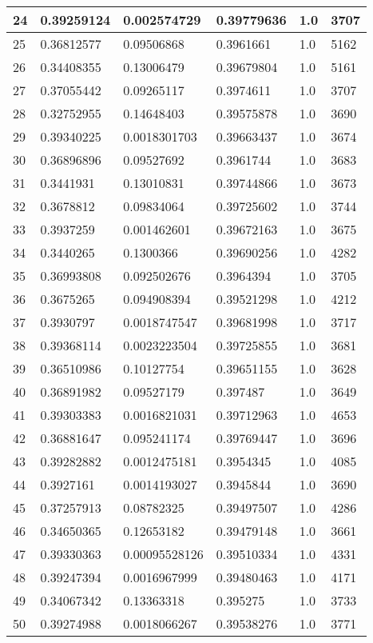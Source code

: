 \begin{longtable}{|l|l|l|l|l|l|}
24 & 0.39259124 & 0.002574729 & 0.39779636 & 1.0 & 3707 \\ \hline 
25 & 0.36812577 & 0.09506868 & 0.3961661 & 1.0 & 5162 \\ \hline 
26 & 0.34408355 & 0.13006479 & 0.39679804 & 1.0 & 5161 \\ \hline 
27 & 0.37055442 & 0.09265117 & 0.3974611 & 1.0 & 3707 \\ \hline 
28 & 0.32752955 & 0.14648403 & 0.39575878 & 1.0 & 3690 \\ \hline 
29 & 0.39340225 & 0.0018301703 & 0.39663437 & 1.0 & 3674 \\ \hline 
30 & 0.36896896 & 0.09527692 & 0.3961744 & 1.0 & 3683 \\ \hline 
31 & 0.3441931 & 0.13010831 & 0.39744866 & 1.0 & 3673 \\ \hline 
32 & 0.3678812 & 0.09834064 & 0.39725602 & 1.0 & 3744 \\ \hline 
33 & 0.3937259 & 0.001462601 & 0.39672163 & 1.0 & 3675 \\ \hline 
34 & 0.3440265 & 0.1300366 & 0.39690256 & 1.0 & 4282 \\ \hline 
35 & 0.36993808 & 0.092502676 & 0.3964394 & 1.0 & 3705 \\ \hline 
36 & 0.3675265 & 0.094908394 & 0.39521298 & 1.0 & 4212 \\ \hline 
37 & 0.3930797 & 0.0018747547 & 0.39681998 & 1.0 & 3717 \\ \hline 
38 & 0.39368114 & 0.0023223504 & 0.39725855 & 1.0 & 3681 \\ \hline 
39 & 0.36510986 & 0.10127754 & 0.39651155 & 1.0 & 3628 \\ \hline 
40 & 0.36891982 & 0.09527179 & 0.397487 & 1.0 & 3649 \\ \hline 
41 & 0.39303383 & 0.0016821031 & 0.39712963 & 1.0 & 4653 \\ \hline 
42 & 0.36881647 & 0.095241174 & 0.39769447 & 1.0 & 3696 \\ \hline 
43 & 0.39282882 & 0.0012475181 & 0.3954345 & 1.0 & 4085 \\ \hline 
44 & 0.3927161 & 0.0014193027 & 0.3945844 & 1.0 & 3690 \\ \hline 
45 & 0.37257913 & 0.08782325 & 0.39497507 & 1.0 & 4286 \\ \hline 
46 & 0.34650365 & 0.12653182 & 0.39479148 & 1.0 & 3661 \\ \hline 
47 & 0.39330363 & 0.00095528126 & 0.39510334 & 1.0 & 4331 \\ \hline 
48 & 0.39247394 & 0.0016967999 & 0.39480463 & 1.0 & 4171 \\ \hline 
49 & 0.34067342 & 0.13363318 & 0.395275 & 1.0 & 3733 \\ \hline 
50 & 0.39274988 & 0.0018066267 & 0.39538276 & 1.0 & 3771 \\ \hline 
\end{longtable}